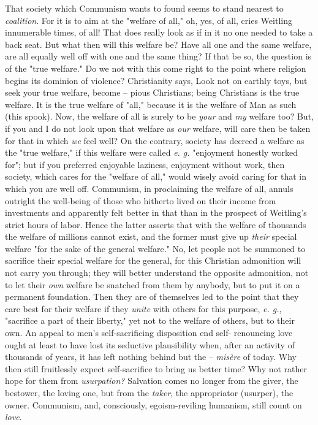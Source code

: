 \documentclass[a4paper]{book}
\begin{document}
That society which Communism wants to found seems to stand nearest to 
\textit{coalition}. For it is to aim at the "{}welfare of all,"{} oh, yes, of 
all, cries Weitling innumerable times, of all! That does really look as if in 
it no one needed to take a back seat. But what then will this welfare be? Have 
all one and the same welfare, are all equally well off with one and the same 
thing? If that be so, the question is of the "{}true welfare."{} Do we not 
with this come right to the point where religion begins its dominion of 
violence? Christianity says, Look not on earthly toys, but seek your true 
welfare, become -- pious Christians; being Christians is the true welfare. It 
is the true welfare of "{}all,"{} because it is the welfare of Man as such 
(this spook). Now, the welfare of all is surely to be \textit{your} and 
\textit{my} welfare too? But, if you and I do not look upon that welfare as 
\textit{our} welfare, will care then be taken for that in which \textit{we} 
feel well? On the contrary, society has decreed a welfare as the "{}true 
welfare,"{} if this welfare were called \textit{e. g.} "{}enjoyment honestly 
worked for"{}; but if you preferred enjoyable laziness, enjoyment without 
work, then society, which cares for the "{}welfare of all,"{} would wisely 
avoid caring for that in which you are well off. Communism, in proclaiming the 
welfare of all, annuls outright the well-being of those who hitherto lived on 
their income from investments and apparently felt better in that than in the 
prospect of Weitling's strict hours of labor. Hence the latter asserts that 
with the welfare of thousands the welfare of millions cannot exist, and the 
former must give up \textit{their} special welfare "{}for the sake of the 
general welfare."{} No, let people not be summoned to sacrifice their special 
welfare for the general, for this Christian admonition will not carry you 
through; they will better understand the opposite admonition, not to let their 
\textit{own} welfare be snatched from them by anybody, but to put it on a 
permanent foundation. Then they are of themselves led to the point that they 
care best for their welfare if they \textit{unite} with others for this 
purpose, \textit{e. g.}, "{}sacrifice a part of their liberty,"{} yet not to 
the welfare of others, but to their own. An appeal to men's self-sacrificing 
disposition end self- renouncing love ought at least to have lost its 
seductive plausibility when, after an activity of thousands of years, it has 
left nothing behind but the -- \textit{mis\`ere} of today. Why then still 
fruitlessly expect self-sacrifice to bring us better time? Why not rather hope 
for them from \textit{usurpation?} Salvation comes no longer from the giver, 
the bestower, the loving one, but from the \textit{taker}, the appropriator 
(usurper), the owner. Communism, and, consciously, egoism-reviling humanism, 
still count on \textit{love}.
\end{document}
